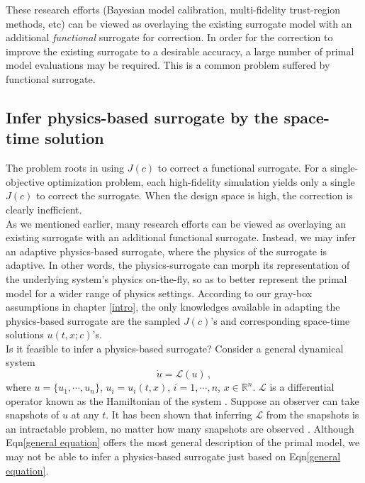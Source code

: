 \documentclass[a4paper,onecolumn]{article}
\theoremstyle{remark}
\begin{document}
\noindent These research efforts (Bayesian model calibration, multi-fidelity 
trust-region methods, etc) can be viewed as overlaying the existing surrogate model with 
an additional \emph{functional}
surrogate for correction. In order for the correction to improve the existing surrogate 
to a desirable accuracy, a large number of primal model evaluations may be required.
This is a common problem suffered by functional surrogate.\\


\subsection{Infer physics-based surrogate by the space-time solution}

\noindent The problem roots in using $J(c)$ to correct a functional surrogate. 
For a single-objective optimization problem, each high-fidelity simulation yields
only a single $J(c)$ to correct the surrogate. When the design space is high, the
correction is clearly inefficient.\\

\noindent As we mentioned earlier, many research efforts can be viewed as overlaying an
existing surrogate with an additional functional surrogate.
Instead, we may infer an adaptive physics-based surrogate, where
the physics of the surrogate is adaptive. 
In other words, the physics-surrogate can morph its representation of the 
underlying system's physics on-the-fly, so as to better represent the primal model for
a wider range of physics settings.
According to our gray-box assumptions in chapter \ref{intro},
the only knowledges available in adapting the physics-based surrogate
are the sampled $J(c)$'s and corresponding space-time solutions $u(t,x;c)$'s.\\

\noindent Is it feasible to infer a
physics-based surrogate? Consider a general dynamical system
\begin{equation}
    \dot{u} = \mathcal{L}(u)\,,
    \label{general equation}
\end{equation}
where $u=\{u_1,\cdots, u_n\}$, $u_i = u_i(t,x)$, $i=1,\cdots,n$, $x\in \mathbb{R}^n$.
$\mathcal{L}$ is a differential operator known as the Hamiltonian of the system 
\cite{Hamilton Fluid Dynamics}.
Suppose an observer can take snapshots of $u$ at any $t$.
It has been shown that inferring $\mathcal{L}$ from the snapshots is an intractable
problem, no matter how many snapshots are observed \cite{NP hard}.
Although Eqn\eqref{general equation} offers the most general description of the 
primal model, we may not be able to infer a physics-based surrogate 
just based on Eqn\eqref{general equation}.\\
\end{document}
